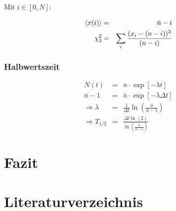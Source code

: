 \documentclass[12pt,a4paper]{scrartcl}
\numberwithin{equation}{section} %
\renewcommand{\[}{} %
\renewcommand{\]}{\noindent} %
\begin{document}
Mit \(i\in[0, N]\):

\[
\begin{eqnarray}
    \expval{x(i)} &=& \bar n - i \\
    \chi^2_3 &=& \sum_i \frac{(x_i-(n - i))^2}{(n - i)}
\end{eqnarray}
\]

\hypertarget{totzeit}{%
\subsubsection{Halbwertszeit}\label{totzeit}}
\begin{eqnarray}
	N(t) &=& \bar{n} \cdot \exp[-\lambda t] \\
	\bar{n}-1 &=& \bar{n} \cdot \exp[-\lambda \Delta t] \\
	\Rightarrow \lambda &=& \frac{1}{\Delta t} \ln(\frac{\bar{n}}{\bar{n}-1}) \\
	\Rightarrow T_{1/2} &=& \frac{\Delta t \ln(2)}{\ln(\frac{\bar{n}}{\bar{n}-1})}
\end{eqnarray}

\clearpage
\hypertarget{fazit}{%
\section{Fazit}\label{fazit}}

\clearpage
\hypertarget{literatur}{\section{Literaturverzeichnis}\label{literatur}}
\renewcommand{\section}[2]{}
\end{document}
